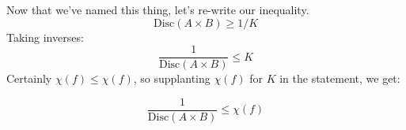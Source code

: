 Now that we've named this thing, let's re-write our inequality.
\[\text{Disc}(A \times B) \geq 1 / K\]
\pause
Taking inverses:
\[\frac{1}{\text{Disc}(A \times B)} \leq K\]
\pause
Certainly $\chi(f) \leq \chi(f)$, so supplanting $\chi(f)$ for $K$ in the statement, we get:
\begin{lemma}
\[\frac{1}{\text{Disc}(A \times B)} \leq \chi(f)\]
\end{lemma}